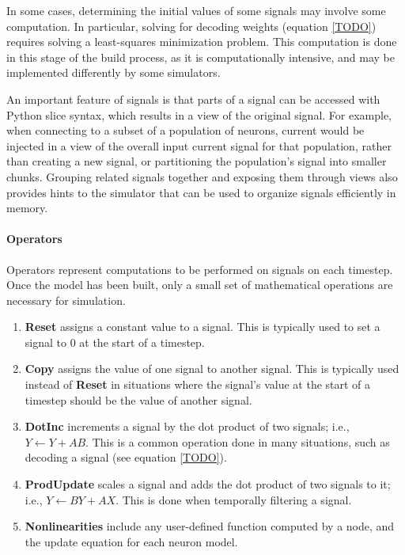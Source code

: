 \documentclass{frontiersSCNS}
\begin{document}
In some cases, determining
the initial values of some signals
may involve some computation.
In particular, solving for decoding weights
(equation \eqref{TODO}) requires
solving a least-squares minimization problem.
This computation is done in this stage
of the build process,
as it is computationally intensive,
and may be implemented
differently by some simulators.

An important feature of signals
is that parts of a signal
can be accessed with Python slice syntax,
which results in a view of the original signal.
For example, when connecting to
a subset of a population of neurons,
current would be injected
in a view of the overall input current signal
for that population,
rather than creating a new signal,
or partitioning the population's signal
into smaller chunks.
Grouping related signals together
and exposing them through views
also provides hints to the simulator
that can be used to organize signals
efficiently in memory.

\paragraph{Operators}
Operators represent computations
to be performed on signals on each timestep.
Once the model has been built,
only a small set of mathematical
operations are necessary for simulation.
\begin{enumerate}
  \item \textbf{Reset} assigns a constant value to a signal.
    This is typically used to set a signal to 0
    at the start of a timestep.
  \item \textbf{Copy} assigns the value
    of one signal to another signal.
    This is typically used instead of \textbf{Reset}
    in situations where the signal's value
    at the start of a timestep should
    be the value of another signal.
  \item \textbf{DotInc} increments a signal by
    the dot product of two signals;
    i.e., $Y \leftarrow Y + AB$.
    This is a common operation
    done in many situations,
    such as decoding a signal (see equation \eqref{TODO}).
  \item \textbf{ProdUpdate} scales a signal
    and adds the dot product of two signals to it;
    i.e., $Y \leftarrow BY + AX$.
    This is done when temporally filtering a signal.
  \item \textbf{Nonlinearities} include any
    user-defined function computed by a node,
    and the update equation for each neuron model.
\end{enumerate}
\end{document}
